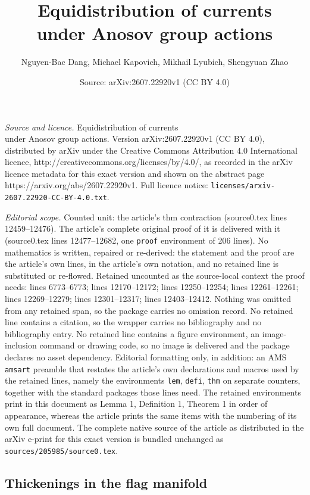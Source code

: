\documentclass[10pt,a4paper]{amsart}
\title{Equidistribution of currents\\ under Anosov group actions}
\author{Nguyen-Bac Dang, Michael Kapovich, Mikhail Lyubich, Shengyuan Zhao}
\date{Source: arXiv:2607.22920v1 (CC BY 4.0)}
\begin{document}
\maketitle

\noindent\emph{Source and licence.} Equidistribution of currents\\ under Anosov group actions. Version arXiv:2607.22920v1 (CC BY 4.0), distributed by arXiv under the Creative Commons Attribution 4.0 International licence, http://creativecommons.org/licenses/by/4.0/, as recorded in the arXiv licence metadata for this exact version and shown on the abstract page https://arxiv.org/abs/2607.22920v1. Full licence notice: \texttt{licenses/arxiv-2607.22920-CC-BY-4.0.txt}.\par\smallskip

\noindent\textit{Editorial scope.} Counted unit: the article's thm contraction (source0.tex lines 12459--12476). The article's complete original proof of it is delivered with it (source0.tex lines 12477--12682, one \texttt{proof} environment of 206 lines). No mathematics is written, repaired or re-derived: the statement and the proof are the article's own lines, in the article's own notation, and no retained line is substituted or re-flowed.  Retained uncounted as the source-local context the proof needs: lines 6773--6773; lines 12170--12172; lines 12250--12254; lines 12261--12261; lines 12269--12279; lines 12301--12317; lines 12403--12412.  Nothing was omitted from any retained span, so the package carries no omission record.  No retained line contains a citation, so the wrapper carries no bibliography and no bibliography entry.  No retained line contains a figure environment, an image-inclusion command or drawing code, so no image is delivered and the package declares no asset dependency.  Editorial formatting only, in addition: an AMS \texttt{amsart} preamble that restates the article's own declarations and macros used by the retained lines, namely the environments \texttt{lem}, \texttt{defi}, \texttt{thm} on separate counters, together with the standard packages those lines need.  The retained environments print in this document as Lemma 1, Definition 1, Theorem 1 in order of appearance, whereas the article prints the same items with the numbering of its own full document.  The complete native source of the article as distributed in the arXiv e-print for this exact version is bundled unchanged as \texttt{sources/205985/source0.tex}.
\subsection{Thickenings in the flag manifold}\label{sec:Thickenings in the flag manifold}
\end{document}
